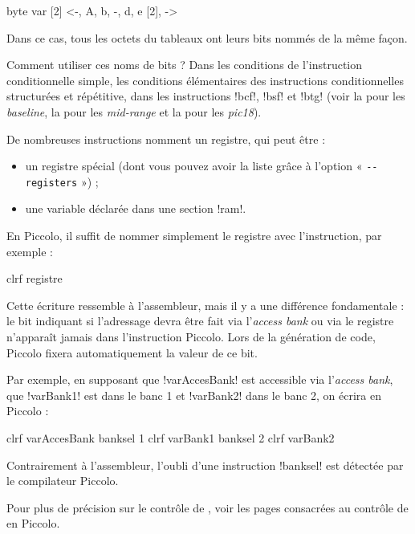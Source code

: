 \begin{piccolo}
byte var [2] <-, A, b, -, d, e [2], ->
\end{piccolo}

Dans ce cas, tous les octets du tableaux ont leurs bits nommés de la même façon.

Comment utiliser ces noms de bits ? Dans les conditions de l'instruction conditionnelle simple, les conditions élémentaires des instructions conditionnelles structurées et répétitive, dans les instructions \pic!bcf!, \pic!bsf! et \pic!btg! (voir la  pour les \emph{baseline}, la  pour les \emph{mid-range} et la  pour les \emph{pic18}). 



De nombreuses instructions nomment un registre, qui peut être :
\begin{itemize}
  \item un registre spécial (dont vous pouvez avoir la liste grâce à l'option « \texttt{-{}-registers} ») ;
  \item une variable déclarée dans une section \pic!ram!.
\end{itemize}

En Piccolo, il suffit de nommer simplement le registre avec l'instruction, par exemple :
\begin{piccolo}
clrf registre
\end{piccolo}

Cette écriture ressemble à l'assembleur, mais il y a une différence fondamentale : le bit indiquant si l'adressage devra être fait via l'\emph{access bank} ou via le registre  n'apparaît jamais dans l'instruction Piccolo. Lors de la génération de code, Piccolo fixera automatiquement la valeur de ce bit.

Par exemple, en supposant que \pic!varAccesBank! est accessible via l'\emph{access bank}, que \pic!varBank1! est dans le banc 1 et \pic!varBank2! dans le banc 2, on écrira en Piccolo :

\begin{piccolo}
clrf varAccesBank
banksel 1
clrf varBank1
banksel 2
clrf varBank2
\end{piccolo}

Contrairement à l'assembleur, l'oubli d'une instruction \pic!banksel! est détectée par le compilateur Piccolo.

Pour plus de précision sur le contrôle de , voir les pages consacrées au contrôle de  en Piccolo.

